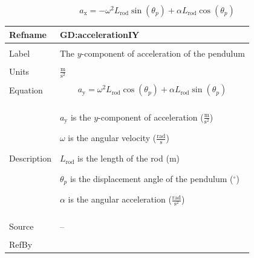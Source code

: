 \documentclass[12pt]{article}
\begin{document}
\begin{displaymath}
{a_{\text{x}}}=-ω^{2} {L_{\text{rod}}} \sin\left({θ_{p}}\right)+α {L_{\text{rod}}} \cos\left({θ_{p}}\right)
\end{displaymath}
\vspace{\baselineskip}
\noindent
\begin{minipage}{\textwidth}
\begin{tabular}{>{\raggedright}p{}>{\raggedright\arraybackslash}p{}}
\toprule \textbf{Refname} & \textbf{GD:accelerationIY}
\label{GD:accelerationIY}
\\ \midrule \\
Label & The $y$-component of acceleration of the pendulum
        
\\ \midrule \\
Units & $\frac{\text{m}}{\text{s}^{2}}$
        
\\ \midrule \\
Equation & \begin{displaymath}
           {a_{\text{y}}}=ω^{2} {L_{\text{rod}}} \cos\left({θ_{p}}\right)+α {L_{\text{rod}}} \sin\left({θ_{p}}\right)
           \end{displaymath}
\\ \midrule \\
Description & \begin{symbDescription}
              \item{${a_{\text{y}}}$ is the $y$-component of acceleration ($\frac{\text{m}}{\text{s}^{2}}$)}
              \item{$ω$ is the angular velocity ($\frac{\text{rad}}{\text{s}}$)}
              \item{${L_{\text{rod}}}$ is the length of the rod (${\text{m}}$)}
              \item{${θ_{p}}$ is the displacement angle of the pendulum (${{}^{\circ}}$)}
              \item{$α$ is the angular acceleration ($\frac{\text{rad}}{\text{s}^{2}}$)}
              \end{symbDescription}
\\ \midrule \\
Source & --
         
\\ \midrule \\
RefBy & 
\\ \bottomrule
\end{tabular}
\end{minipage}
\end{document}
